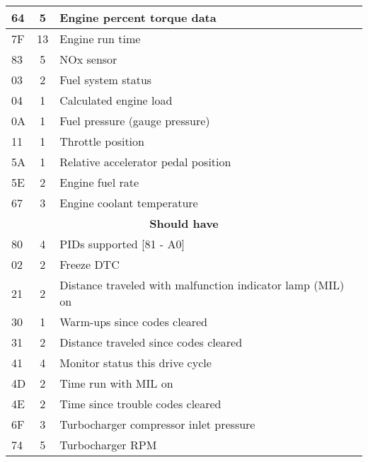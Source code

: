 \begin{longtable}{|l|c|p{10cm}|}
    64 & 5  & Engine percent torque data                                    \\ \hline
    7F & 13 & Engine run time                                               \\ \hline
    83 & 5  & NOx sensor                                                    \\ \hline
    03 & 2  & Fuel system status                                            \\ \hline
    04 & 1  & Calculated engine load                                        \\ \hline
    0A & 1  & Fuel pressure (gauge pressure)                                \\ \hline
    11 & 1  & Throttle position                                             \\ \hline
    5A & 1  & Relative accelerator pedal position                           \\ \hline
    5E & 2  & Engine fuel rate                                              \\ \hline
    67 & 3  & Engine coolant temperature                                    \\ \hline
    \multicolumn{3}{|c|}{\textbf{Should have}}                              \\ \hline
    80 & 4  & PIDs supported [81 - A0]                                      \\ \hline
    02 & 2  & Freeze DTC                                                    \\ \hline
    21 & 2  & Distance traveled with malfunction indicator lamp (MIL) on    \\ \hline
    30 & 1  & Warm-ups since codes cleared                                  \\ \hline
    31 & 2  & Distance traveled since codes cleared                         \\ \hline
    41 & 4  & Monitor status this drive cycle                               \\ \hline
    4D & 2  & Time run with MIL on                                          \\ \hline
    4E & 2  & Time since trouble codes cleared                              \\ \hline
    6F & 3  & Turbocharger compressor inlet pressure                        \\ \hline
    74 & 5  & Turbocharger RPM                                              \\ \hline

\end{longtable}
